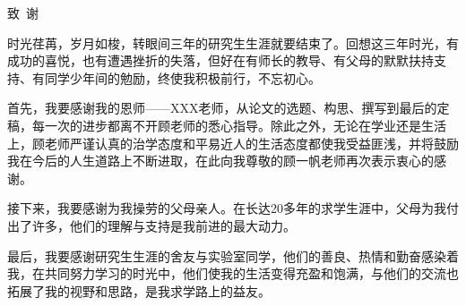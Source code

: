 \begin{szuAppendix}{致~谢}

\songti{}
\setlength{\baselineskip}{23pt}

时光荏苒，岁月如梭，转眼间三年的研究生生涯就要结束了。回想这三年时光，有成功的喜悦，也有遭遇挫折的失落，但好在有师长的教导、有父母的默默扶持支持、有同学少年间的勉励，终使我积极前行，不忘初心。

首先，我要感谢我的恩师——XXX老师，从论文的选题、构思、撰写到最后的定稿，每一次的进步都离不开顾老师的悉心指导。除此之外，无论在学业还是生活上，顾老师严谨认真的治学态度和平易近人的生活态度都使我受益匪浅，并将鼓励我在今后的人生道路上不断进取，在此向我尊敬的顾一帆老师再次表示衷心的感谢。

接下来，我要感谢为我操劳的父母亲人。在长达20多年的求学生涯中，父母为我付出了许多，他们的理解与支持是我前进的最大动力。

最后，我要感谢研究生生涯的舍友与实验室同学，他们的善良、热情和勤奋感染着我，在共同努力学习的时光中，他们使我的生活变得充盈和饱满，与他们的交流也拓展了我的视野和思路，是我求学路上的益友。


\end{szuAppendix}

